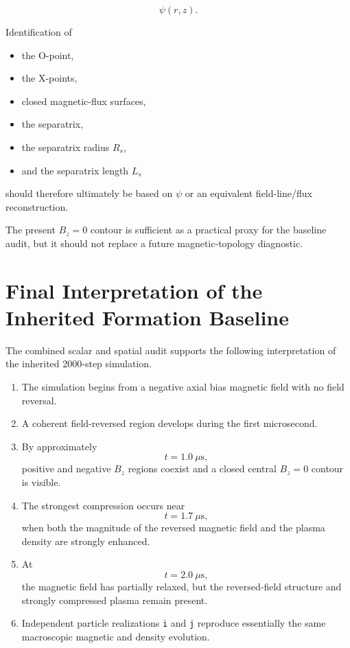 \documentclass[11pt,a4paper]{article}
\begin{document}
\[
\psi(r,z).
\]

Identification of

\begin{itemize}
    \item the O-point,
    \item the X-points,
    \item closed magnetic-flux surfaces,
    \item the separatrix,
    \item the separatrix radius \(R_s\),
    \item and the separatrix length \(L_s\)
\end{itemize}

should therefore ultimately be based on \(\psi\) or an equivalent
field-line/flux reconstruction.

The present \(B_z=0\) contour is sufficient as a practical proxy for the
baseline audit, but it should not replace a future magnetic-topology
diagnostic.


\section{Final Interpretation of the Inherited Formation Baseline}

The combined scalar and spatial audit supports the following interpretation
of the inherited 2000-step simulation.

\begin{enumerate}[label=\arabic*.]

    \item The simulation begins from a negative axial bias magnetic field with
    no field reversal.

    \item A coherent field-reversed region develops during the first
    microsecond.

    \item By approximately
    \[
    t=1.0~\mu\mathrm{s},
    \]
    positive and negative \(B_z\) regions coexist and a closed central
    \(B_z=0\) contour is visible.

    \item The strongest compression occurs near
    \[
    t=1.7~\mu\mathrm{s},
    \]
    when both the magnitude of the reversed magnetic field and the plasma
    density are strongly enhanced.

    \item At
    \[
    t=2.0~\mu\mathrm{s},
    \]
    the magnetic field has partially relaxed, but the reversed-field
    structure and strongly compressed plasma remain present.

    \item Independent particle realizations \texttt{i} and \texttt{j}
    reproduce essentially the same macroscopic magnetic and density
    evolution.

\end{enumerate}
\end{document}
